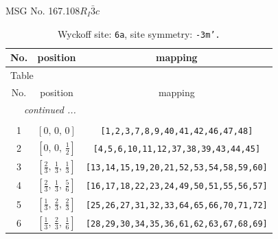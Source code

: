 \documentclass[fleqn,8pt]{jsarticle}
\begin{document}
\setcounter{MaxMatrixCols}{32}

\renewcommand{\tablename}{Table~}
\renewcommand{\figurename}{Figure~}
\begin{center}
\LARGE
MSG No. 167.108\quad$R_{I}\bar{3}c$
\end{center}
\renewcommand{\arraystretch}{1.2}
\begin{longtable}{ccc}
\caption{Wyckoff site: {\tt 6a}, site symmetry: {\tt -3m'.}}
 \\
 \hline \hline
No. & position & mapping \\ \hline \endfirsthead

\multicolumn{2}{l}{\tablename\ \thetable{}} \\
 \hline \hline
No. & position & mapping \\ \hline \endhead

 \hline \hline
\multicolumn{2}{r}{\footnotesize\it continued ...} \\ \endfoot

 \hline \hline
\multicolumn{2}{r}{} \\ \endlastfoot

1 & $\left[ 0,\, 0,\, 0 \right]$ & {\tt [1,2,3,7,8,9,40,41,42,46,47,48]} \\ \hline
2 & $\left[ 0,\, 0,\, \frac{1}{2} \right]$ & {\tt [4,5,6,10,11,12,37,38,39,43,44,45]} \\ \hline
3 & $\left[ \frac{2}{3},\, \frac{1}{3},\, \frac{1}{3} \right]$ & {\tt [13,14,15,19,20,21,52,53,54,58,59,60]} \\ \hline
4 & $\left[ \frac{2}{3},\, \frac{1}{3},\, \frac{5}{6} \right]$ & {\tt [16,17,18,22,23,24,49,50,51,55,56,57]} \\ \hline
5 & $\left[ \frac{1}{3},\, \frac{2}{3},\, \frac{2}{3} \right]$ & {\tt [25,26,27,31,32,33,64,65,66,70,71,72]} \\ \hline
6 & $\left[ \frac{1}{3},\, \frac{2}{3},\, \frac{1}{6} \right]$ & {\tt [28,29,30,34,35,36,61,62,63,67,68,69]} \\
\end{longtable}
\renewcommand{\arraystretch}{1.2}
\end{document}
